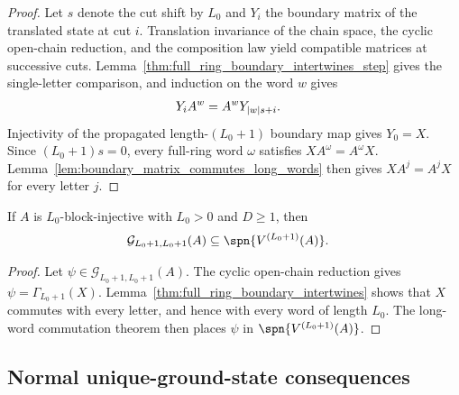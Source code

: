 \begin{proof}
    \leanok
    Let $s$ denote the cut shift by $L_0$ and $Y_i$ the boundary matrix of
    the translated state at cut $i$. Translation invariance of the chain space,
    the cyclic open-chain reduction, and the composition law yield compatible
    matrices at successive cuts. Lemma~\ref{thm:full_ring_boundary_intertwines_step}
    gives the single-letter comparison, and induction on the word $w$ gives
    \begin{align}
        Y_i A^w
         & =A^wY_{|w|s+i}.
        \notag
    \end{align}
    Injectivity of the propagated length-$(L_0+1)$ boundary map gives $Y_0=X$.
    Since $(L_0+1)s=0$, every full-ring word $\omega$ satisfies
    $XA^\omega=A^\omega X$. Lemma~\ref{lem:boundary_matrix_commutes_long_words}
    then gives $XA^j=A^jX$ for every letter $j$.
\end{proof}

\begin{lemma}
    \label{thm:full_ring_ground_space_containment}
    \leanok
    If $A$ is $L_0$-block-injective with $L_0>0$ and $D\ge1$, then
    \begin{align}
        \mathcal G_{L_0+1,L_0+1}(A)
         & \subseteq \spn\{V^{(L_0+1)}(A)\}.
        \notag
    \end{align}
\end{lemma}

\begin{proof}
    \leanok
    Let $\psi\in\mathcal G_{L_0+1,L_0+1}(A)$. The cyclic open-chain reduction
    gives $\psi=\Gamma_{L_0+1}(X)$. Lemma~\ref{thm:full_ring_boundary_intertwines}
    shows that $X$ commutes with every letter, and hence with every word of
    length $L_0$. The long-word commutation theorem then places $\psi$ in
    $\spn\{V^{(L_0+1)}(A)\}$.
\end{proof}

\subsection{Normal unique-ground-state consequences}\label{subsec:normal_unique_ground_state}

